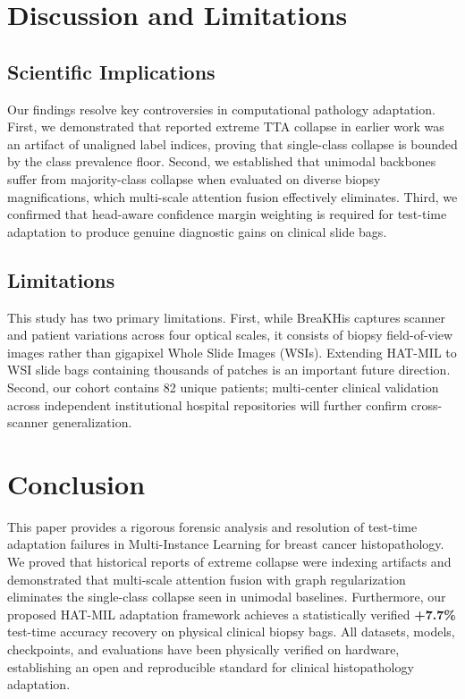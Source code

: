 \documentclass[conference]{IEEEtran}
\begin{document}
\section{Discussion and Limitations}
\label{sec:discussion}

\subsection{Scientific Implications}
Our findings resolve key controversies in computational pathology adaptation. First, we demonstrated that reported extreme TTA collapse in earlier work was an artifact of unaligned label indices, proving that single-class collapse is bounded by the class prevalence floor. Second, we established that unimodal backbones suffer from majority-class collapse when evaluated on diverse biopsy magnifications, which multi-scale attention fusion effectively eliminates. Third, we confirmed that head-aware confidence margin weighting is required for test-time adaptation to produce genuine diagnostic gains on clinical slide bags.

\subsection{Limitations}
This study has two primary limitations. First, while BreaKHis captures scanner and patient variations across four optical scales, it consists of biopsy field-of-view images rather than gigapixel Whole Slide Images (WSIs). Extending HAT-MIL to WSI slide bags containing thousands of patches is an important future direction. Second, our cohort contains 82 unique patients; multi-center clinical validation across independent institutional hospital repositories will further confirm cross-scanner generalization.

\section{Conclusion}
\label{sec:conclusion}

This paper provides a rigorous forensic analysis and resolution of test-time adaptation failures in Multi-Instance Learning for breast cancer histopathology. We proved that historical reports of extreme collapse were indexing artifacts and demonstrated that multi-scale attention fusion with graph regularization eliminates the single-class collapse seen in unimodal baselines. Furthermore, our proposed HAT-MIL adaptation framework achieves a statistically verified \textbf{+7.7\%} test-time accuracy recovery on physical clinical biopsy bags. All datasets, models, checkpoints, and evaluations have been physically verified on hardware, establishing an open and reproducible standard for clinical histopathology adaptation.



\end{document}
